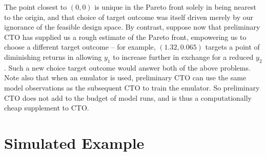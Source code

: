 \documentclass[12pt]{article}
\begin{document}
%
The point closest to $(0,0)$ is 
%
unique in the Pareto front solely in being nearest to the origin, and that choice of target outcome was itself driven merely by our ignorance of the feasible design space.
%
%
By contrast, suppose now that preliminary CTO has supplied us a rough estimate of the Pareto front, empowering us to choose a different target outcome -- for example, $(1.32,0.065)$ targets a point of diminishing returns in allowing $y_1$ to increase further in exchange for a reduced $y_2$.
%
%
Such a new choice target outcome would answer both  of the above problems.
%
%
%
%
Note also that when an emulator is used, preliminary CTO can use the same model observations as the subsequent CTO to train the emulator.
%
So preliminary CTO does not add to the budget of model runs, and is thus a computationally cheap supplement to CTO.
%

%
\section{Simulated Example}\label{example}
%
\end{document}
